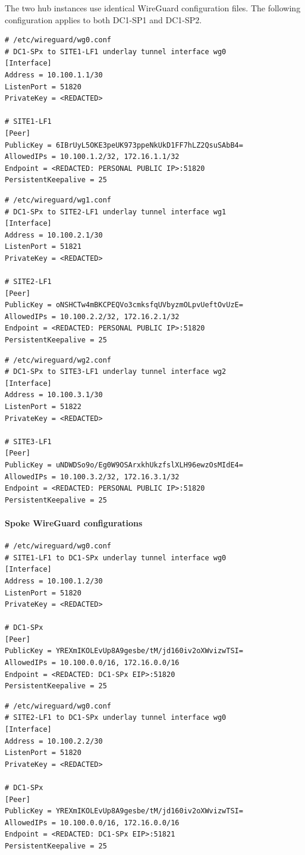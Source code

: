 \documentclass[11pt]{article}
\begin{document}
The two hub instances use identical WireGuard configuration files. The following configuration applies to both DC1-SP1 and DC1-SP2.

\begin{verbatim}
# /etc/wireguard/wg0.conf
# DC1-SPx to SITE1-LF1 underlay tunnel interface wg0
[Interface]
Address = 10.100.1.1/30
ListenPort = 51820
PrivateKey = <REDACTED>

# SITE1-LF1
[Peer]
PublicKey = 6IBrUyL5OKE3peUK973ppeNkUkD1FF7hLZ2QsuSAbB4=
AllowedIPs = 10.100.1.2/32, 172.16.1.1/32
Endpoint = <REDACTED: PERSONAL PUBLIC IP>:51820
PersistentKeepalive = 25
\end{verbatim}

\begin{verbatim}
# /etc/wireguard/wg1.conf
# DC1-SPx to SITE2-LF1 underlay tunnel interface wg1
[Interface]
Address = 10.100.2.1/30
ListenPort = 51821
PrivateKey = <REDACTED>

# SITE2-LF1
[Peer]
PublicKey = oNSHCTw4mBKCPEQVo3cmksfqUVbyzmOLpvUeftOvUzE=
AllowedIPs = 10.100.2.2/32, 172.16.2.1/32
Endpoint = <REDACTED: PERSONAL PUBLIC IP>:51820
PersistentKeepalive = 25
\end{verbatim}

\begin{verbatim}
# /etc/wireguard/wg2.conf
# DC1-SPx to SITE3-LF1 underlay tunnel interface wg2
[Interface]
Address = 10.100.3.1/30
ListenPort = 51822
PrivateKey = <REDACTED>

# SITE3-LF1
[Peer]
PublicKey = uNDWDSo9o/Eg0W9OSArxkhUkzfslXLH96ewzOsMIdE4=
AllowedIPs = 10.100.3.2/32, 172.16.3.1/32
Endpoint = <REDACTED: PERSONAL PUBLIC IP>:51820
PersistentKeepalive = 25
\end{verbatim}

\paragraph{Spoke WireGuard configurations}

\begin{verbatim}
# /etc/wireguard/wg0.conf
# SITE1-LF1 to DC1-SPx underlay tunnel interface wg0
[Interface]
Address = 10.100.1.2/30
ListenPort = 51820
PrivateKey = <REDACTED>

# DC1-SPx
[Peer]
PublicKey = YREXmIKOLEvUp8A9gesbe/tM/jd160iv2oXWvizwTSI=
AllowedIPs = 10.100.0.0/16, 172.16.0.0/16
Endpoint = <REDACTED: DC1-SPx EIP>:51820
PersistentKeepalive = 25
\end{verbatim}

\begin{verbatim}
# /etc/wireguard/wg0.conf
# SITE2-LF1 to DC1-SPx underlay tunnel interface wg0
[Interface]
Address = 10.100.2.2/30
ListenPort = 51820
PrivateKey = <REDACTED>

# DC1-SPx
[Peer]
PublicKey = YREXmIKOLEvUp8A9gesbe/tM/jd160iv2oXWvizwTSI=
AllowedIPs = 10.100.0.0/16, 172.16.0.0/16
Endpoint = <REDACTED: DC1-SPx EIP>:51821
PersistentKeepalive = 25
\end{verbatim}
\end{document}
